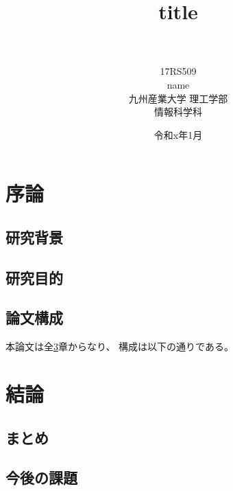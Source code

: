\documentclass[a4paper,12pt,uplatex]{jsreport}
\title{
 \Huge{title}\\
 \vspace{5.5cm}\\
}
\author{\LARGE{17RS509}\vspace{0.5cm}\\
\LARGE{name}\vspace{2cm}\\
\LARGE{九州産業大学 理工学部}\vspace{0.5cm}\\
\LARGE{情報科学科}\vspace{1cm}\\
}
\date{\LARGE{令和x年1月}}
\begin{document}
\maketitle
\tableofcontents
\listoffigures
\listoftables


\chapter{序論}\label{chap:joron}

\section{研究背景}\label{sec:haikei}
    
\section{研究目的}\label{sec:mokuteki}

\section{論文構成}\label{sec:kousei}

本論文は全\ref{chap:keturon}章からなり、
構成は以下の通りである。


\chapter{}\label{chap:x}


\chapter{結論}\label{chap:keturon}

\section{まとめ}\label{sec:matome}
 
\section{今後の課題}\label{sec:kadai}
\end{document}
